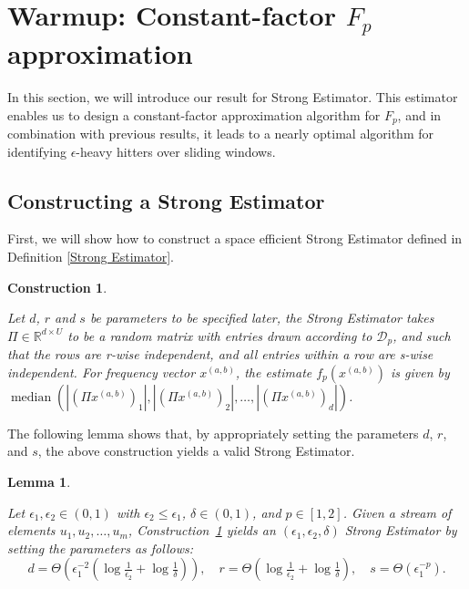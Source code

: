 \documentclass{article}
\newcommand{\est}{\textsf{Strong Estimator }}
\newcommand{\estt}{\textsf{Strong Estimator}}
\DeclareMathOperator{\med}{median}
\theoremstyle{plain}
\newtheorem{lem}[theorem]{Lemma}
\newtheorem{construction}[theorem]{Construction}
\begin{document}
 
\section{Warmup: Constant-factor $F_p$ approximation}

In this section, we will introduce our result for \estt. This estimator enables us to design a constant-factor approximation algorithm for $F_p$, and in combination with previous results, it leads to a nearly optimal algorithm for identifying $\epsilon$-heavy hitters over sliding windows.

\subsection{Constructing a Strong Estimator}

First, we will show how to construct a space efficient \est defined in Definition \ref{Strong Estimator}. 

\begin{construction}\label{construct est}
    
Let $d$, $r$ and $s$ be parameters to be specified later, the  \est takes $\Pi \in \mathbb{R}^{d \times U}$ to be a random matrix with entries drawn according to $\mathcal{D}_p$, and such that the rows are r-wise independent, and all entries within a row are s-wise independent. For frequency vector $x ^ {(a, b)}$, the estimate $f_p(x ^ {(a, b)})$ is given by  $\med(|(\Pi x ^ {(a, b)})_1|,|(\Pi x ^ {(a, b)})_2|, \dots, |(\Pi x ^ {(a, b)})_d|)$. 
        
\end{construction}

The following lemma shows that, by appropriately setting the parameters $d$, $r$, and $s$, the above construction yields a valid \estt.


\begin{lem} \label{est}

Let $\epsilon_1, \epsilon_2 \in (0, 1)$ with $\epsilon_2 \le \epsilon_1$, $\delta \in (0, 1)$, and $p \in [1, 2]$. Given a stream of elements $u_1, u_2, \dots, u_m$, Construction~\ref{construct est} yields an $(\epsilon_1, \epsilon_2, \delta)$ \est by setting the parameters as follows:
\[
d = \Theta\left(\epsilon_1^{-2} \left( \log \tfrac{1}{\epsilon_2} + \log \tfrac{1}{\delta} \right) \right), \quad
r = \Theta\left( \log \tfrac{1}{\epsilon_2} + \log \tfrac{1}{\delta} \right), \quad
s = \Theta\left( \epsilon_1^{-p} \right).
\]
\end{lem}
\end{document}

